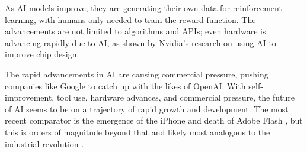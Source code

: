 As AI models improve, they are generating their own data for reinforcement learning, with humans only needed to train the reward function. The advancements are not limited to algorithms and APIs; even hardware is advancing rapidly due to AI, as shown by Nvidia's research on using AI to improve chip design.\par
The rapid advancements in AI are causing commercial pressure, pushing companies like Google to catch up with the likes of OpenAI. With self-improvement, tool use, hardware advances, and commercial pressure, the future of AI seems to be on a trajectory of rapid growth and development. The most recent comparator is the emergence of the iPhone and death of Adobe Flash \cite{horton2019death}, but this is orders of magnitude beyond that and likely most analogous to the industrial revolution \cite{trajtenberg2018ai}. 
